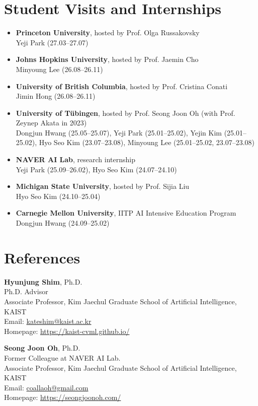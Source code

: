 \documentclass[letterpaper,11pt]{article}
\begin{document}
\section{Student Visits and Internships}

\begin{itemize}[leftmargin=1.2em, itemsep=0.3em]
    \item \textbf{Princeton University}, hosted by Prof. Olga Russakovsky \\
    Yeji Park (27.03--27.07)

    \item \textbf{Johns Hopkins University}, hosted by Prof. Jaemin Cho \\
    Minyoung Lee (26.08--26.11)

    \item \textbf{University of British Columbia}, hosted by Prof. Cristina Conati \\
    Jimin Hong (26.08--26.11)

    \item \textbf{University of T\"ubingen}, hosted by Prof. Seong Joon Oh (with Prof. Zeynep Akata in 2023) \\
    Dongjun Hwang (25.05--25.07), Yeji Park (25.01--25.02), Yejin Kim (25.01--25.02), Hyo Seo Kim (23.07--23.08), Minyoung Lee (25.01--25.02, 23.07--23.08)

    \item \textbf{NAVER AI Lab}, research internship \\
    Yeji Park (25.09--26.02), Hyo Seo Kim (24.07--24.10)

    \item \textbf{Michigan State University}, hosted by Prof. Sijia Liu \\
    Hyo Seo Kim (24.10--25.04)

    \item \textbf{Carnegie Mellon University}, IITP AI Intensive Education Program \\
    Dongjun Hwang (24.09--25.02)
\end{itemize}

\section{References}

\textbf{Hyunjung Shim}, Ph.D.\\
Ph.D. Advisor\\
Associate Professor, Kim Jaechul Graduate School of Artificial Intelligence, KAIST\\
Email: \href{mailto:kateshim@kaist.ac.kr}{kateshim@kaist.ac.kr} \\
Homepage: \href{https://kaist-cvml.github.io/}{https://kaist-cvml.github.io/}

\vspace{0.4cm}

\textbf{Seong Joon Oh}, Ph.D.\\
Former Colleague at NAVER AI Lab.\\
Associate Professor, Kim Jaechul Graduate School of Artificial Intelligence, KAIST\\
Email: \href{mailto:coallaoh@gmail.com}{coallaoh@gmail.com} \\
Homepage: \href{https://seongjoonoh.com/}{https://seongjoonoh.com/}
\end{document}
